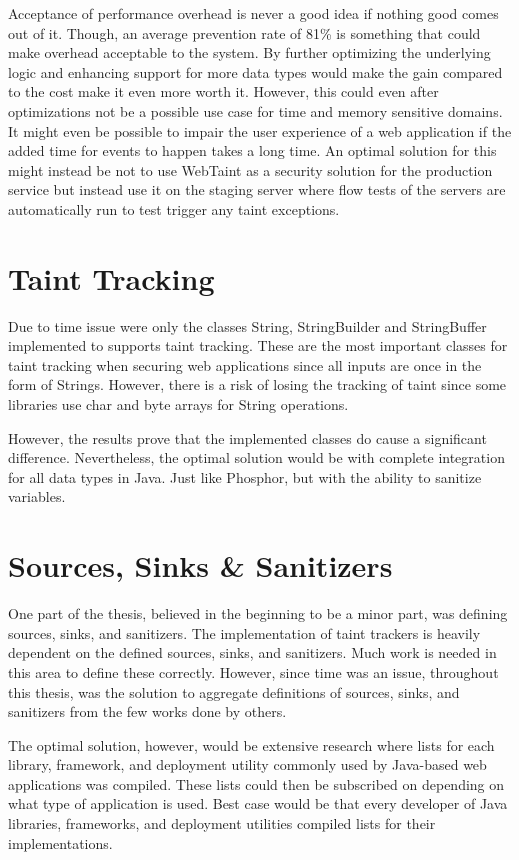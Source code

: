 Acceptance of performance overhead is never a good idea if nothing good comes out of it. Though, an average prevention rate of 81\% is something that could make overhead acceptable to the system. By further optimizing the underlying logic and enhancing support for more data types would make the gain compared to the cost make it even more worth it. However, this could even after optimizations not be a possible use case for time and memory sensitive domains. It might even be possible to impair the user experience of a web application if the added time for events to happen takes a long time. An optimal solution for this might instead be not to use WebTaint as a security solution for the production service but instead use it on the staging server where flow tests of the servers are automatically run to test trigger any taint exceptions.



\section{Taint Tracking}
\label{propagation}
Due to time issue were only the classes String, StringBuilder and StringBuffer implemented to supports taint tracking. These are the most important classes for taint tracking when securing web applications since all inputs are once in the form of Strings. However, there is a risk of losing the tracking of taint since some libraries use char and byte arrays for String operations.

However, the results prove that the implemented classes do cause a significant difference. Nevertheless, the optimal solution would be with complete integration for all data types in Java. Just like Phosphor, but with the ability to sanitize variables.



\section{Sources, Sinks \& Sanitizers}
\label{sss}
One part of the thesis, believed in the beginning to be a minor part, was defining sources, sinks, and sanitizers. The implementation of taint trackers is heavily dependent on the defined sources, sinks, and sanitizers. Much work is needed in this area to define these correctly. However, since time was an issue, throughout this thesis, was the solution to aggregate definitions of sources, sinks, and sanitizers from the few works done by others. 

The optimal solution, however, would be extensive research where lists for each library, framework, and deployment utility commonly used by Java-based web applications was compiled. These lists could then be subscribed on depending on what type of application is used. Best case would be that every developer of Java libraries, frameworks, and deployment utilities compiled lists for their implementations.

